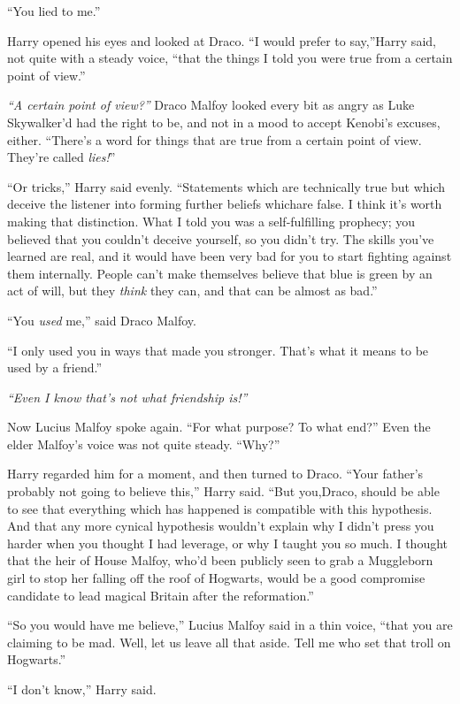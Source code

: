 ``You lied to me.''

Harry opened his eyes and looked at Draco. ``I would prefer to say,''Harry said, not quite with a steady voice, ``that the things I told you were true from a certain point of view.''

\emph{``A certain point of view?''} Draco Malfoy looked every bit as angry as Luke Skywalker'd had the right to be, and not in a mood to accept Kenobi's excuses, either. ``There's a word for things that are true from a certain point of view. They're called \emph{lies!}''

``Or tricks,'' Harry said evenly. ``Statements which are technically true but which deceive the listener into forming further beliefs whichare false. I think it's worth making that distinction. What I told you was a self-fulfilling prophecy; you believed that you couldn't deceive yourself, so you didn't try. The skills you've learned are real, and it would have been very bad for you to start fighting against them internally. People can't make themselves believe that blue is green by an act of will, but they \emph{think} they can, and that can be almost as bad.''

``You \emph{used} me,'' said Draco Malfoy.

``I only used you in ways that made you stronger. That's what it means to be used by a friend.''

\emph{``Even I know that's not what friendship is!''}

Now Lucius Malfoy spoke again. ``For what purpose? To what end?'' Even the elder Malfoy's voice was not quite steady. ``Why?''

Harry regarded him for a moment, and then turned to Draco. ``Your father's probably not going to believe this,'' Harry said. ``But you,Draco, should be able to see that everything which has happened is compatible with this hypothesis. And that any more cynical hypothesis wouldn't explain why I didn't press you harder when you thought I had leverage, or why I taught you so much. I thought that the heir of House Malfoy, who'd been publicly seen to grab a Muggleborn girl to stop her falling off the roof of Hogwarts, would be a good compromise candidate to lead magical Britain after the reformation.''

``So you would have me believe,'' Lucius Malfoy said in a thin voice, ``that you are claiming to be mad. Well, let us leave all that aside. Tell me who set that troll on Hogwarts.''

``I don't know,'' Harry said.


